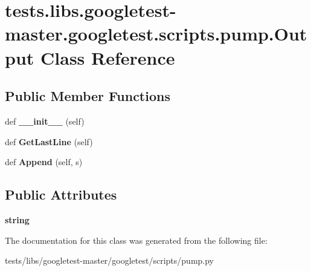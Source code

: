 \hypertarget{classtests_1_1libs_1_1googletest-master_1_1googletest_1_1scripts_1_1pump_1_1Output}{}\section{tests.\+libs.\+googletest-\/master.googletest.\+scripts.\+pump.\+Output Class Reference}
\label{classtests_1_1libs_1_1googletest-master_1_1googletest_1_1scripts_1_1pump_1_1Output}
\subsection*{Public Member Functions}
\begin{DoxyCompactItemize}
\item 
\mbox{\label{classtests_1_1libs_1_1googletest-master_1_1googletest_1_1scripts_1_1pump_1_1Output_a2cec1d4aca70bc62e2de8b6353077b5d}} 
def {\bfseries \+\_\+\+\_\+init\+\_\+\+\_\+} (self)
\item 
\mbox{\label{classtests_1_1libs_1_1googletest-master_1_1googletest_1_1scripts_1_1pump_1_1Output_aa2cd322f2f60382683ac2ffdf54c1186}} 
def {\bfseries Get\+Last\+Line} (self)
\item 
\mbox{\label{classtests_1_1libs_1_1googletest-master_1_1googletest_1_1scripts_1_1pump_1_1Output_a7d809090fb37b8989d90fa4bd840e71b}} 
def {\bfseries Append} (self, s)
\end{DoxyCompactItemize}
\subsection*{Public Attributes}
\begin{DoxyCompactItemize}
\item 
\mbox{\label{classtests_1_1libs_1_1googletest-master_1_1googletest_1_1scripts_1_1pump_1_1Output_ab0cd3d0c48e88e4eb97edf5f296a7365}} 
{\bfseries string}
\end{DoxyCompactItemize}


The documentation for this class was generated from the following file\+:\begin{DoxyCompactItemize}
\item 
tests/libs/googletest-\/master/googletest/scripts/pump.\+py\end{DoxyCompactItemize}
